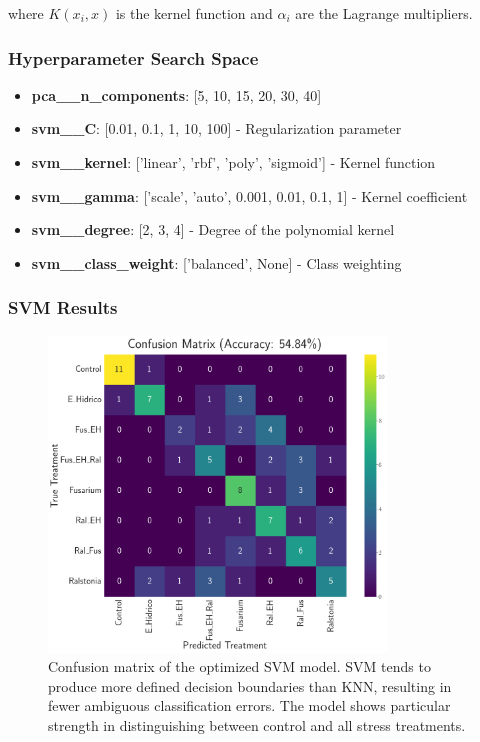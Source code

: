 \documentclass[12pt,a4paper]{article}
\begin{document}
where $K(x_i, x)$ is the kernel function and $\alpha_i$ are the Lagrange multipliers.

\subsubsection{Hyperparameter Search Space}

\begin{itemize}
    \item \textbf{pca\_\_n\_components}: [5, 10, 15, 20, 30, 40]
    \item \textbf{svm\_\_C}: [0.01, 0.1, 1, 10, 100] - Regularization parameter
    \item \textbf{svm\_\_kernel}: ['linear', 'rbf', 'poly', 'sigmoid'] - Kernel function
    \item \textbf{svm\_\_gamma}: ['scale', 'auto', 0.001, 0.01, 0.1, 1] - Kernel coefficient
    \item \textbf{svm\_\_degree}: [2, 3, 4] - Degree of the polynomial kernel
    \item \textbf{svm\_\_class\_weight}: ['balanced', None] - Class weighting
\end{itemize}

\subsubsection{SVM Results}

\begin{figure}[H]
    \centering
    \includegraphics[width=0.8\textwidth]{Plots/SVM_Confusion_Matrix.png}
    \caption{Confusion matrix of the optimized SVM model. SVM tends to produce more defined decision boundaries than KNN, resulting in fewer ambiguous classification errors. The model shows particular strength in distinguishing between control and all stress treatments.}
    \label{fig:svm_confusion}
\end{figure}
\end{document}
